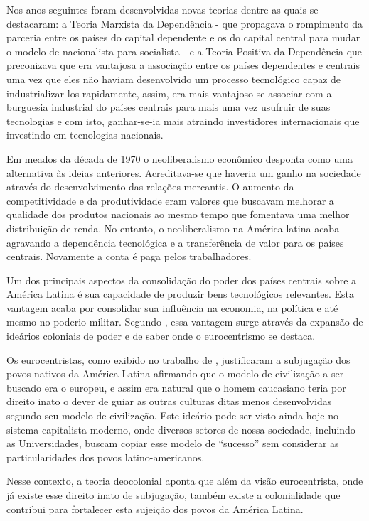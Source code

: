 Nos anos seguintes foram desenvolvidas novas teorias dentre as quais se destacaram: a Teoria Marxista da Dependência - que propagava o rompimento da parceria entre os países do capital dependente e os do capital central para mudar o modelo de nacionalista para socialista - e a Teoria Positiva da Dependência que preconizava que era vantajosa a associação entre os países dependentes e centrais uma vez que eles não haviam desenvolvido um processo tecnológico capaz de industrializar-los rapidamente, assim, era mais vantajoso se associar com a burguesia industrial do países centrais para mais uma vez usufruir de suas tecnologias e com isto, ganhar-se-ia mais atraindo investidores internacionais que investindo em tecnologias nacionais.

Em meados da década de 1970 o neoliberalismo econômico desponta como uma alternativa às ideias anteriores. Acreditava-se que haveria um ganho na sociedade através do desenvolvimento das relações mercantis. O aumento da competitividade e da produtividade eram valores que buscavam melhorar a qualidade dos produtos nacionais ao mesmo tempo que fomentava uma melhor distribuição de renda. No entanto, o neoliberalismo na América latina acaba agravando a dependência tecnológica e a transferência de valor para os países centrais. Novamente a conta é paga pelos trabalhadores.

Um dos principais aspectos da consolidação do poder dos países centrais sobre a América Latina é sua capacidade de produzir bens tecnológicos relevantes. Esta vantagem acaba por consolidar sua influência na economia, na política e até mesmo no poderio militar. Segundo \cite{quijano2005colonialidade}, essa vantagem surge através da expansão de ideários coloniais de poder e de saber onde o eurocentrismo se destaca.

Os eurocentristas, como exibido no trabalho de \cite{quijano2005colonialidade}, justificaram a subjugação dos povos nativos da América Latina afirmando que o modelo de civilização a ser buscado era o europeu, e assim era natural que o homem caucasiano teria por direito inato o dever de guiar as outras culturas ditas menos desenvolvidas segundo seu modelo de civilização. Este ideário pode ser visto ainda hoje no sistema capitalista moderno, onde diversos setores de nossa sociedade, incluindo as Universidades, buscam copiar esse modelo de ``sucesso'' sem considerar as particularidades dos povos latino-americanos.

Nesse contexto, a teoria deocolonial aponta que além da visão eurocentrista, onde já existe esse direito inato de subjugação, também existe a colonialidade que contribui para fortalecer esta sujeição dos povos da América Latina.

